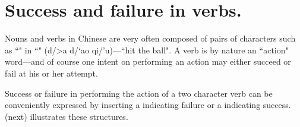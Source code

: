 \section{Success and failure in verbs.}
Nouns and verbs in Chinese are very often composed of pairs of characters
such as ``" in ``" (d/>a d/`ao qi/'u)---``hit the ball".
A verb is by nature an ``action" word---and of course one intent on
performing an action may either succeed or fail at his or her attempt.
\\
%
\hfill\begin{minipage}{\tw-120mm}%
  Success or failure in performing the action of a two character
  verb can be conveniently expressed by inserting a  indicating failure
  or a  indicating success.
   (next) illustrates these structures.
\end{minipage}\hfill%

